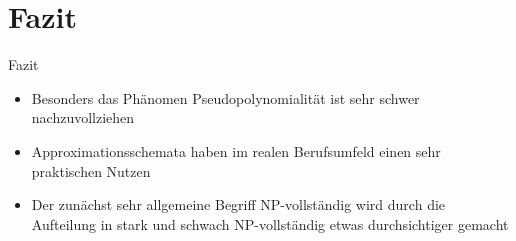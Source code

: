\section{Fazit}

\begin{frame}{Fazit}
	\begin{itemize}
		\item Besonders das Phänomen Pseudopolynomialität ist sehr schwer nachzuvollziehen
		\item Approximationsschemata haben im realen Berufsumfeld einen sehr praktischen Nutzen
		\item Der zunächst sehr allgemeine Begriff NP-vollständig wird durch die Aufteilung in stark und schwach NP-vollständig etwas durchsichtiger gemacht
	\end{itemize}    
\end{frame}